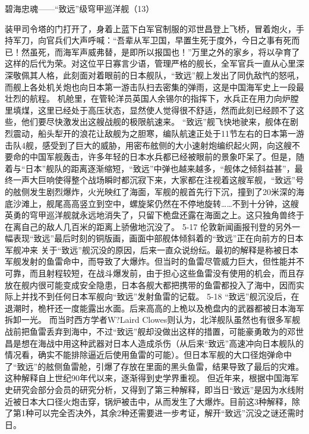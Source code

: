 \documentclass[12pt,UTF8]{ctexbook}
\begin{document}
碧海忠魂——“致远”级穹甲巡洋舰（13）

装甲司令塔的门打开了，身着上蓝下白军官制服的邓世昌登上飞桥，冒着炮火，手持军刀，向官兵们大声呼喊：“吾辈从军卫国，早置生死于度外，今日之事有死而已！然虽死，而海军声威弗替，是即所以报国也！”万里之外的家乡，将以孕育了这样的后代为荣。对这位平日寡言少语，管理严格的舰长，全军官兵一直从心里深深敬佩其人格，此刻面对着眼前的日本舰队，“致远”舰上发出了同仇敌忾的怒吼，而舰上各处机关炮也向日本第一游击队扫去密集的弹雨，这是中国海军史上一段最壮烈的航程。
机舱里，在管轮洋员英国人余锡尔的指挥下，水兵正在用力向炉膛里填煤，这里已经处于高压状态，显然使人觉得很不舒适，然而此刻已经顾不了这些，他们要尽快激发出这艘战舰的极限航速来。
“致远”舰飞快地驶来，舰体在剧烈震动，船头犁开的浪花让敌舰为之胆寒，编队航速正处于11节左右的日本第一游击队4舰，感受到了巨大的威胁，用密布舷侧的大小速射炮编织起火网，向这艘不要命的中国军舰轰击，许多年轻的日本水兵都已经被眼前的景象吓呆了。但是，随着与“日本”舰队的距离逐渐缩短，“致远”中弹也越来越多，“舰体之倾斜益甚”，最终一声大巨响使得整个战场瞬时都沉寂下来，大家都在注视着这艘军舰，“致远”号的舷侧发生剧烈爆炸，火光映红了海面，军舰的舰首先行下沉，撞到了20米深的海底沙滩上，舰尾高高竖立到空中，螺旋桨仍然在不停地旋转……不到十分钟，这艘英勇的穹甲巡洋舰就永远地消失了，只留下桅盘还露在海面之上。这只独角兽终于在离自己的敌人几百米的距离上骄傲地沉没了。
5-17
伦敦新闻画报刊登的另外一幅表现“致远”最后时刻的铜版画，画面中部舰体倾斜着的“致远”正在向前方的日本军舰冲来
关于“致远”舰沉没的原因，后来一直众说纷纭。最初的解释是称被日本军舰发射的鱼雷命中，而导致了大爆炸。但当时的鱼雷尽管威力巨大，但性能并不可靠，而且射程较短，在战斗爆发前，由于担心这些鱼雷没有使用的机会，而且存放在舰内很可能变成安全隐患，日本各舰大都把携带的鱼雷都投入了海中，因而实际上并找不到任何日本军舰向“致远”发射鱼雷的记载。
5-18
“致远”舰沉没后，在退潮时，桅杆还一度能露出水面。后来高高的上桅以及桅盘内的武器都被日本海军拆卸一光。
而当时西方学者W?Laird Clowes则认为，北洋舰队虽然也有很多军舰战前把鱼雷丢弃到海中，不过“致远”舰却没做出这样的措置，可能豪勇敢为的邓世昌是想在海战中用这种武器对日本人造成杀伤（从后来“致远”高速冲向日本舰队的情况看，确实不能排除逼近后使用鱼雷的可能）。但日本军舰的大口径炮弹命中了“致远”的舷侧鱼雷舱，引爆了存放在里面的黑头鱼雷，结果导致了最后的灾难。这种解释自上世纪90年代以来，逐渐得到史学界重视。
但近年来，根据中国海军史研究会部分会员的研究分析，又得到了第三种解释，即当日“致远”是因为水线附近被日本大口径火炮击穿，锅炉被击中，从而发生了大爆炸。目前这3种解释，除了第1种可以完全否决外，其余2种还需要进一步考证，解开“致远”沉没之谜还需时日。
\end{document}
